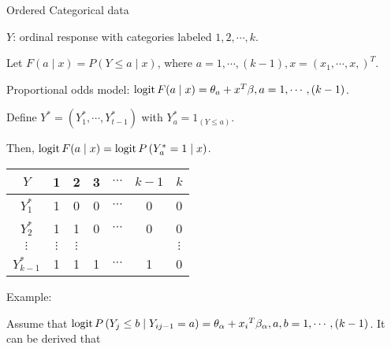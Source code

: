 \documentclass[UTF8,a4paper,10pt]{article}
\begin{document}
\begin{Problem}[]{
Ordered Categorical data}


$Y$: ordinal response with categories labeled $1,2, \cdots, k$.


Let $F(a \mid x)=P(Y \leq a \mid x)$, where $a=1, \cdots,(k-1), x=\left(x_1, \cdots, x,\right)^T$.

Proportional odds model: $\operatorname{logit} F(a \mid x)=\theta_a+x^T \beta, a=1, \cdots,(k-1)$.

Define $Y^*=\left(Y_1^*, \cdots, Y_{t-1}^*\right)$ with $Y_a^*=1_{(Y\leq a)}$. 

Then, $\operatorname{logit} F(a \mid x)=\operatorname{logit} P\left(Y_a^*=1 \mid x\right)$.



\begin{center}
\begin{tabular}{c|cccccc}
    
    $Y$ & 1 & 2 & 3 & $\cdots$ & $k-1$ & $k$ \\
    \hline$Y_1^*$ & 1 & 0 & 0 & $\cdots$ & 0 & 0 \\
    $Y_2^*$ & 1 & 1 & 0 & $\cdots$ & 0 & 0 \\
    $\vdots$ & $\vdots$ & $\vdots$ & & & & $\vdots$ \\
    $Y_{k-1}^*$ & 1 & 1 & 1 & $\cdots$ & 1 & 0
  \end{tabular}
\end{center}


\dotfill


Example:


Assume that $\operatorname{logit} P\left(Y_j \leq b \mid Y_{i j-1}=a\right)=\theta_\alpha+x_i{ }^T \beta_\alpha, a, b=1, \cdots,(k-1)$. It can be derived that



\end{Problem}
\end{document}
